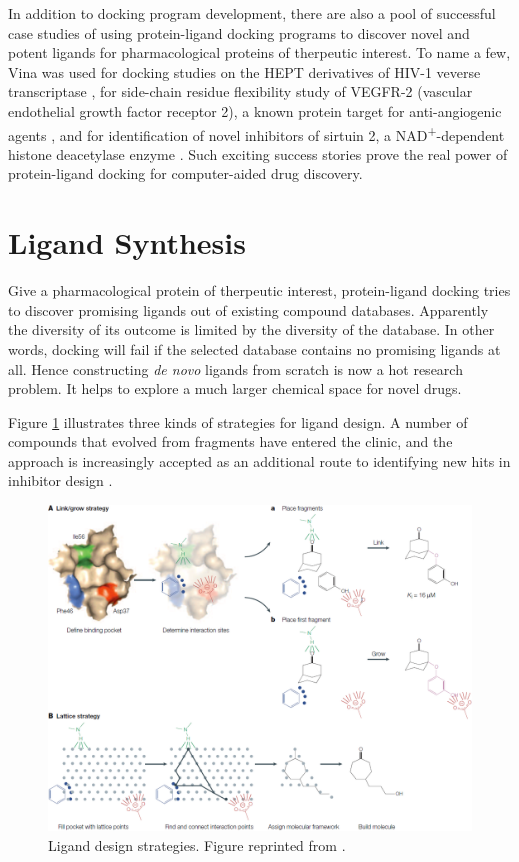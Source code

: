 In addition to docking program development, there are also a pool of successful case studies of using protein-ligand docking programs to discover novel and potent ligands for pharmacological proteins of therpeutic interest. To name a few, Vina was used for docking studies on the HEPT derivatives of HIV-1 veverse transcriptase \citep{843}, for side-chain residue flexibility study of VEGFR-2 (vascular endothelial growth factor receptor 2), a known protein target for anti-angiogenic agents \citep{1084}, and for identification of novel inhibitors of sirtuin 2, a NAD\textsuperscript{+}-dependent histone deacetylase enzyme \citep{1177}. Such exciting success stories prove the real power of protein-ligand docking for computer-aided drug discovery.

\section{Ligand Synthesis}

Give a pharmacological protein of therpeutic interest, protein-ligand docking tries to discover promising ligands out of existing compound databases. Apparently the diversity of its outcome is limited by the diversity of the database. In other words, docking will fail if the selected database contains no promising ligands at all. Hence constructing \textit{de novo} ligands from scratch is now a hot research problem. It helps to explore a much larger chemical space for novel drugs.

Figure \ref{igrow:LigandDesign} \citep{363} illustrates three kinds of strategies for ligand design. A number of compounds that evolved from fragments have entered the clinic, and the approach is increasingly accepted as an additional route to identifying new hits in inhibitor design \citep{363,470}.

\begin{figure}[t]
\centering
\includegraphics[width=\textwidth]{igrow/LigandDesign.png}
\caption{Ligand design strategies. Figure reprinted from \citep{363}.}
\label{igrow:LigandDesign}
\end{figure}

